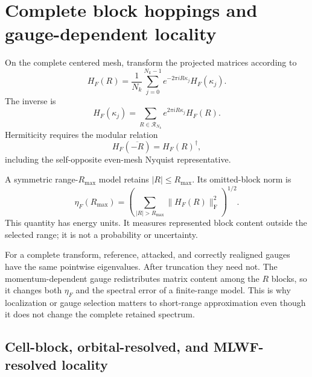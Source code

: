 \section{Complete block hoppings and gauge-dependent locality}

On the complete centered mesh, transform the projected matrices according to
\begin{equation}
  H_F(R)
  =\frac{1}{N_k}\sum_{j=0}^{N_k-1}
   e^{-2\pi iR\kappa_j}H_F(\kappa_j).
  \label{eq:training-composite-block-transform}
\end{equation}
The inverse is
\begin{equation}
  H_F(\kappa_j)
  =\sum_{R\in\mathcal R_{N_k}}
   e^{2\pi iR\kappa_j}H_F(R).
  \label{eq:training-composite-block-inverse}
\end{equation}
Hermiticity requires the modular relation
\begin{equation}
  H_F(\overline{-R})=H_F(R)^{\dagger},
  \label{eq:training-composite-block-hermiticity}
\end{equation}
including the self-opposite even-mesh Nyquist representative.

A symmetric range-$R_{\max}$ model retains $|R|\leq R_{\max}$. Its omitted-block
norm is
\begin{equation}
  \eta_F(R_{\max})
  =\left(
    \sum_{|R|>R_{\max}}\lVert H_F(R)\rVert_{\mathrm F}^2
   \right)^{1/2}.
  \label{eq:training-composite-omitted-block-norm}
\end{equation}
This quantity has energy units. It measures represented block content outside
the selected range; it is not a probability or uncertainty.

For a complete transform, reference, attacked, and correctly realigned gauges
have the same pointwise eigenvalues. After truncation they need not. The
momentum-dependent gauge redistributes matrix content among the $R$ blocks, so
it changes both $\eta_F$ and the spectral error of a finite-range model. This is
why localization or gauge selection matters to short-range approximation even
though it does not change the complete retained spectrum.

\subsection{Cell-block, orbital-resolved, and MLWF-resolved locality}

